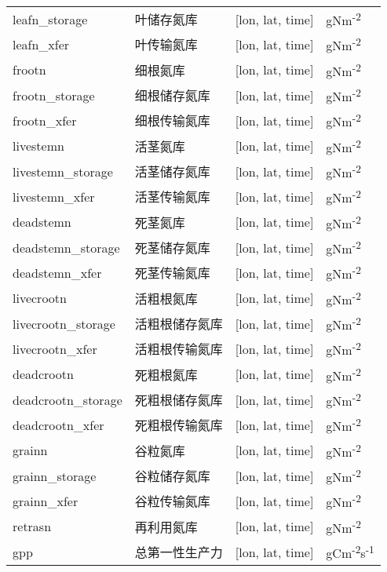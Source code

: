 \documentclass[a4paper,12pt,twoside]{article}
\begin{document}
\begin{longtable}[htbp]{lp{}ll}
leafn\_storage    & 叶储存氮库 & {[}lon, lat, time{]}  & gNm\textsuperscript{-2} \\
leafn\_xfer     & 叶传输氮库 & {[}lon, lat, time{]}  & gNm\textsuperscript{-2} \\
frootn       & 细根氮库 & {[}lon, lat, time{]}  & gNm\textsuperscript{-2} \\
frootn\_storage   & 细根储存氮库 & {[}lon, lat, time{]} & gNm\textsuperscript{-2} \\
frootn\_xfer     & 细根传输氮库 & {[}lon, lat, time{]} & gNm\textsuperscript{-2} \\
livestemn      & 活茎氮库 & {[}lon, lat, time{]}  & gNm\textsuperscript{-2} \\
livestemn\_storage  & 活茎储存氮库 & {[}lon, lat, time{]} & gNm\textsuperscript{-2} \\
livestemn\_xfer   & 活茎传输氮库 & {[}lon, lat, time{]} & gNm\textsuperscript{-2} \\
deadstemn      & 死茎氮库 & {[}lon, lat, time{]}  & gNm\textsuperscript{-2} \\
deadstemn\_storage  & 死茎储存氮库 & {[}lon, lat, time{]} & gNm\textsuperscript{-2} \\
deadstemn\_xfer   & 死茎传输氮库 & {[}lon, lat, time{]} & gNm\textsuperscript{-2} \\
livecrootn & 活粗根氮库 & {[}lon, lat, time{]}  & gNm\textsuperscript{-2} \\
livecrootn\_storage & 活粗根储存氮库 & {[}lon, lat, time{]} & gNm\textsuperscript{-2} \\
livecrootn\_xfer & 活粗根传输氮库 & {[}lon, lat, time{]}  & gNm\textsuperscript{-2} \\
deadcrootn & 死粗根氮库 & {[}lon, lat, time{]}  & gNm\textsuperscript{-2} \\
deadcrootn\_storage & 死粗根储存氮库 & {[}lon, lat, time{]} & gNm\textsuperscript{-2} \\
deadcrootn\_xfer & 死粗根传输氮库 & {[}lon, lat, time{]}  & gNm\textsuperscript{-2} \\
grainn & 谷粒氮库 & {[}lon, lat, time{]}  & gNm\textsuperscript{-2} \\
grainn\_storage & 谷粒储存氮库 & {[}lon, lat, time{]}  & gNm\textsuperscript{-2} \\
grainn\_xfer & 谷粒传输氮库 & {[}lon, lat, time{]}  & gNm\textsuperscript{-2} \\
retrasn & 再利用氮库 & {[}lon, lat, time{]}  & gNm\textsuperscript{-2} \\
gpp & 总第一性生产力 & {[}lon, lat, time{]}  & gCm\textsuperscript{-2}s\textsuperscript{-1} \\

\end{longtable}
\end{document}

